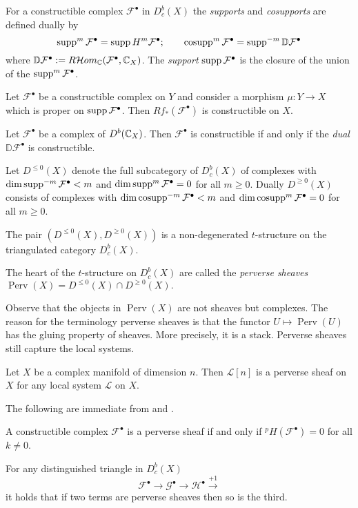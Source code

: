   For a constructible complex $\mathcal{F}^\bullet$ in $D^b_c(X)$ the {\it supports} and {\it cosupports} are defined dually by
  $$\operatorname{supp}^m\mathcal{F}^\bullet = \operatorname{supp} H^m \mathcal{F}^\bullet; \qquad \operatorname{cosupp}^m\mathcal{F}^\bullet = \operatorname{supp}^{-m}\mathbb{D}\mathcal{F}^\bullet$$
  where $\mathbb{D}\mathcal{F}^\bullet := R \mathcal{H}om_{\mathbb{C}}(\mathcal{F}^\bullet,\mathbb{C}_X)$.
  The {\it support} $\operatorname{supp} \mathcal{F}^\bullet$ is the closure of the union of the $\operatorname{supp}^m\mathcal{F}^\bullet$.
  \begin{theorem}{\cite[Theorem 4.1.5.]{dimca2004sheaves}}
    Let $\mathcal{F}^\bullet$ be a constructible complex on $Y$ and consider a morphism $\mu:Y\to X$ which is proper on $\operatorname{supp} \mathcal{F}^\bullet$.
    Then $Rf_*(\mathcal{F}^\bullet)$ is constructible on $X$.
  \end{theorem}
  \begin{theorem}{\cite[Theorem 4.1.16]{dimca2004sheaves}}
    Let $\mathcal{F}^\bullet$ be a complex of $D^b(\mathbb{C}_X)$. Then $\mathcal{F}^\bullet$ is constructible if and only if the {\it dual} $\mathbb{D}\mathcal{F}^\bullet$ is constructible.
  \end{theorem}
  Let $D^{\leq 0}(X)$ denote the full subcategory of $D^b_c(X)$ of complexes with $\dim \operatorname{supp}^{-m} \mathcal{F}^\bullet < m$ and $\dim \operatorname{supp}^m \mathcal{F}^\bullet = 0$ for all $m\geq 0$.
  Dually $D^{\geq 0}(X)$ consists of complexes with $\dim \operatorname{cosupp}^{-m}\mathcal{F}^\bullet <m$ and $\dim \operatorname{cosupp}^m \mathcal{F}^\bullet = 0$ for all $m\geq 0$.
  \begin{proposition}{\cite[Proposition 5.1.12]{dimca2004sheaves}}
    The pair $(D^{\leq 0}(X), D^{\geq 0}(X))$ is a non-degenerated $t$-structure on the triangulated category $D^{b}_c(X)$.
  \end{proposition}
  \begin{definition}
    The heart of the $t$-structure on $D^b_c(X)$ are called the {\it perverse sheaves} $\operatorname{Perv}(X) = D^{\leq 0}(X)\cap D^{\geq 0}(X).$
  \end{definition}
  Observe that the objects in $\operatorname{Perv}(X)$ are not sheaves but complexes.
  The reason for the terminology perverse sheaves is that the functor $U\mapsto \operatorname{Perv}(U)$ has the gluing property of sheaves.
  More precisely, it is a stack.
  Perverse sheaves still capture the local systems.
  \begin{theorem}{\cite[Theorem 5.1.20]{dimca2004sheaves}}
    Let $X$ be a complex manifold of dimension $n$. Then $\mathcal{L}[n]$ is a perverse sheaf on $X$ for any local system $\mathcal{L}$ on $X$.
  \end{theorem}
  The following are immediate from  and .
  \begin{proposition}
    A constructible complex $\mathcal{F}^\bullet$ is a perverse sheaf if and only if $^pH(\mathcal{F}^\bullet) = 0$ for all $k\neq 0$.
  \end{proposition}
  \begin{proposition}
    For any distinguished triangle in $D_c^b(X)$
    $$\mathcal{F}^\bullet \to \mathcal{G}^\bullet \to \mathcal{H}^\bullet \xrightarrow{+1} $$
    it holds that if two terms are perverse sheaves then so is the third.
  \end{proposition}
